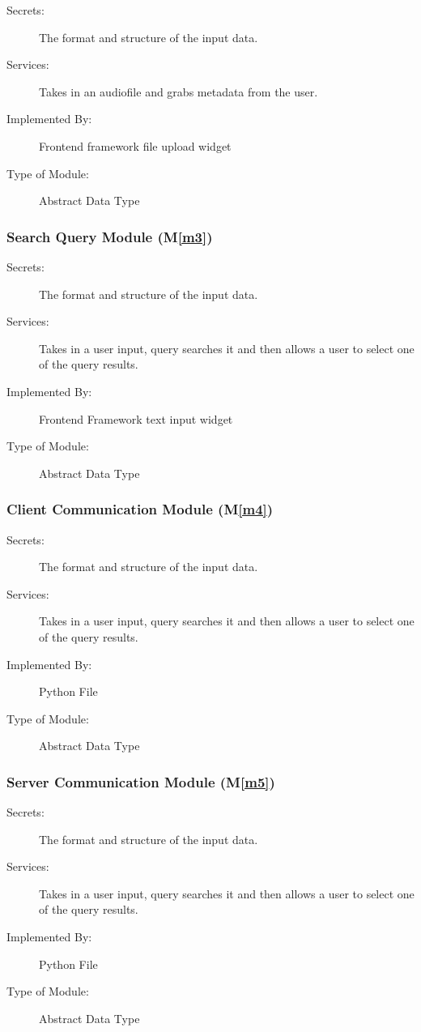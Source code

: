 \documentclass[12pt, titlepage]{article}
\newcommand{\mref}[1]{M\ref{#1}}
\begin{document}
\begin{description}
\item[Secrets:] The format and structure of the input data.
\item[Services:] Takes in an audiofile and grabs metadata from the user. 
\item[Implemented By:] Frontend framework file upload widget
\item[Type of Module:] Abstract Data Type
\end{description}

\subsubsection{Search Query Module (\mref{m3})}

\begin{description}
\item[Secrets:] The format and structure of the input data.
\item[Services:] Takes in a user input, query searches it and then allows a user to select one of the query results. 
\item[Implemented By:] Frontend Framework text input widget
\item[Type of Module:] Abstract Data Type
\end{description}

\subsubsection{Client Communication Module (\mref{m4})}

\begin{description}
\item[Secrets:] The format and structure of the input data.
\item[Services:] Takes in a user input, query searches it and then allows a user to select one of the query results. 
\item[Implemented By:] Python File
\item[Type of Module:] Abstract Data Type
\end{description}

\subsubsection{Server Communication Module (\mref{m5})}

\begin{description}
\item[Secrets:] The format and structure of the input data.
\item[Services:] Takes in a user input, query searches it and then allows a user to select one of the query results. 
\item[Implemented By:] Python File
\item[Type of Module:] Abstract Data Type
\end{description}
\end{document}
